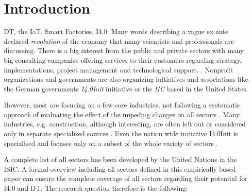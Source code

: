 \section{Introduction}\label{Introduction}
\ac{DT}, the \ac{IoT}, Smart Factories,
\ac{I4.0}. Many words describing a vague ex ante declared
\emph{revolution} of the economy that many scientists and professionals are discussing.
There is a big interest from the public and private sectors with many big consulting companies offering services to their customers regarding strategy, implementations, project management and technological support.
\cite{westerman2011digital,mckinsey-nine-questions,bcg-dt,accenture-dt:2015}.
Nonprofit organizations and governments are also organizing initiatives and associations like the German governments \emph{\ac{I4.0Init}} \cite{i40-web} initiative or the \emph{\ac{IIC}} \cite{iic-web} based in the United States.

However, most are focusing on a few core industries, not following a systematic approach of evaluating the effect of the impeding changes on all sectors \cite{westerman2011digital, pwc2016survey}. 
Many industries, e.g. construction, although interesting, are often left out or considered only in separate specialised sources \cite{rolandbergerBauwirtschaft:2016}. 
Even the nation wide initiative \acl{I4.0Init} is specialised and focuses only on a subset of the whole variety of sectors \cite{umsetzungsstrategie:2015}. 

A complete list of all sectors has been developed by the United Nations in the \ac{ISIC}\cite{ISIC:2008}. A formal overview including all sectors defined in this empirically based paper can ensure the complete coverage of all sectors regarding their potential for \ac{I4.0} and \ac{DT}. The research question therefore is the following:

